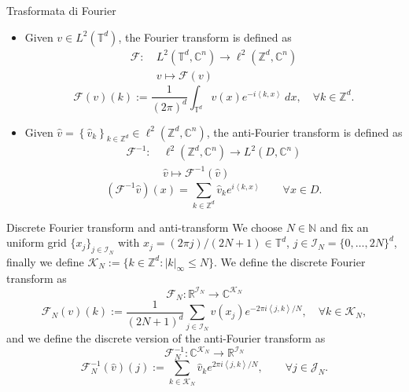 \documentclass{beamer}
\newcommand{\numberset}{\mathbb}
\newcommand{\N}{\numberset{N}}
\newcommand{\Z}{\numberset{Z}}
\newcommand{\R}{\numberset{R}}
\newcommand{\C}{\numberset{C}}
\begin{document}
\begin{frame}[noframenumbering]{Trasformata di Fourier}
	\centering
	\begin{itemize}
		\item  Given $ v \in  L^2(\mathbb{T}^d) $, the Fourier transform is defined as 
		\[ \begin{split}
			\mathcal{F} : \ & L^{2}(\mathbb{T}^d, \C^{n})\to \ell^{2}(\Z^d, \C^{n})\\
			& v \mapsto \mathcal{F}(v)
		\end{split} \]
		\[ \mathcal{F}(v)(k) := \frac{1}{(2 \pi)^{d}} \int_{\mathbb{T}^{d}}v(x) e^{-i \left\langle k , x \right\rangle} \ dx,  \quad \forall k \in \Z^d. \]
		\item Given $ \widehat{v} = \left\lbrace \widehat{v}_k\right\rbrace_{k \in \Z^d} \in \ell^{2}(\Z^d, \C^{n}) $, the anti-Fourier transform is defined as 
		\[ \begin{split}
			\mathcal{F}^{-1} : \ & \ell^{2}(\Z^d, \C^{n}) \to L^{2}(D, \C^{n})\\
			& \widehat{v} \mapsto \mathcal{F}^{-1}(\widehat{v})
		\end{split} \]
		\[ (\mathcal{F}^{-1}\widehat{v})(x) = \sum_{k \in \Z^d} \widehat{v}_k e^{i \left\langle k , x \right\rangle } \qquad \forall x \in D. \]
	\end{itemize}
\end{frame}


\begin{frame}[noframenumbering]{Discrete Fourier transform and anti-transform}
	We choose $ N \in \N $ and fix an uniform grid $ \{x_j\}_{j \in \mathcal{I}_N} $ with $ x_j = (2\pi j)/(2N+1) \in \mathbb{T}^d $, $ j \in \mathcal{I}_N = \{0, \dots, 2N\}^{d} $, finally we define $\mathcal{K}_N := \{k \in \Z^d : |k|_{\infty} \le N\}$.
	We define the discrete Fourier transform as
	\[ \mathcal{F}_{N}: \R^{\mathcal{I}_N} \to \C^{\mathcal{K}_N}\]\[ \mathcal{F}_{N}(v)(k) := \frac{1}{(2N+1)^{d}} \sum_{j \in \mathcal{I}_N}v(x_j) e^{-2\pi i \left\langle j, k \right\rangle/N }, \quad \forall k \in \mathcal{K}_N, \]
	and we define the discrete version of the anti-Fourier transform as
	\[ \mathcal{F}_{N}^{-1}: \C^{\mathcal{K}_N} \to \R^{\mathcal{I}_N}\]\[ \mathcal{F}_{N}^{-1}(\widehat{v})(j) := \sum_{k \in \mathcal{K}_N} \widehat{v}_k e^{2\pi i \left\langle j, k \right\rangle/N }, \qquad \forall j \in \mathcal{J}_N. \]
\end{frame}

\end{document}

